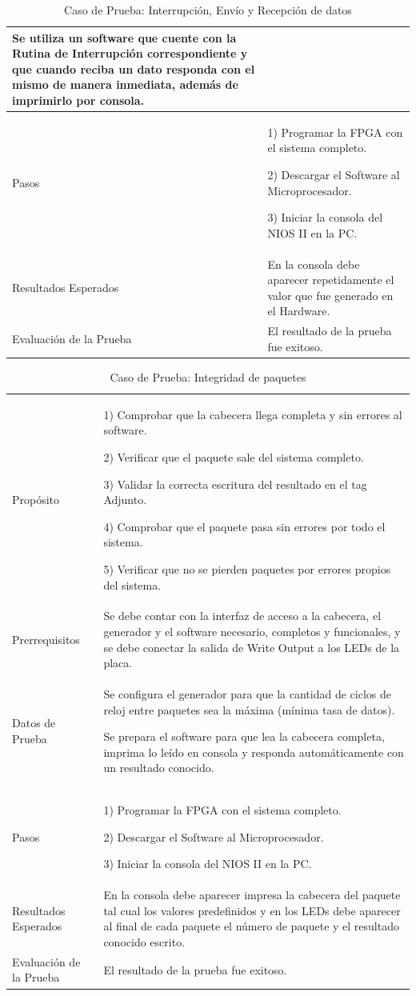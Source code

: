 \begin{table}
\begin{tabular}{|>{\columncolor[gray]{0.8}}l|p{11cm}|}
Se utiliza un software que cuente con la Rutina de Interrupción correspondiente y que cuando reciba un dato responda con el mismo de manera inmediata, además de imprimirlo por consola.
 \\ \hline
 Pasos & 1) Programar la FPGA con el sistema completo.

2) Descargar el Software al Microprocesador.

3) Iniciar la consola del NIOS II en la PC.
\\ \hline
 Resultados Esperados & En la consola debe aparecer repetidamente el valor que fue generado en el Hardware. \\ \hline
 Evaluación de la Prueba  & El resultado de la prueba fue exitoso.\\ \hline
	\end{tabular}
	\caption{Caso de Prueba: Interrupción, Envío y Recepción de datos}
	\label{tab:enviorecepcion}
\end{table}
\begin{table}
	\begin{tabular}{|>{\columncolor[gray]{0.8}}l|p{11cm}|} \hline
\multicolumn{2}{|>{\columncolor[gray]{0.8}}l|}{\textbf{Caso de Prueba: Integridad de paquetes }}\\ \hline
Propósito  & 1) Comprobar que la cabecera llega completa y sin errores al software. 

2) Verificar que el paquete sale del sistema completo.

3) Validar la correcta escritura del resultado en el tag Adjunto.

4) Comprobar que el paquete pasa sin errores por todo el sistema. 

5) Verificar que no se pierden paquetes por errores propios del sistema. 
\\ \hline
 Prerrequisitos  & Se debe contar con la interfaz de acceso a la cabecera, el generador y el software necesario, completos y funcionales, y se debe conectar la salida de Write Output a los LEDs de la placa.\\ \hline
 Datos de Prueba & Se configura el generador para que la cantidad de ciclos de reloj entre paquetes sea la máxima (mínima tasa de datos). 

Se prepara el software para que lea la cabecera completa, imprima lo leído en consola y responda automáticamente con un resultado conocido. 
 \\ \hline
 Pasos & 1) Programar la FPGA con el sistema completo.

2) Descargar el Software al Microprocesador.

3) Iniciar la consola del NIOS II en la PC.
\\ \hline
 Resultados Esperados & En la consola debe aparecer impresa la cabecera del paquete tal cual los valores predefinidos y en los LEDs debe aparecer al final de cada paquete el número de paquete y el resultado conocido escrito.  \\ \hline
 Evaluación de la Prueba  & El resultado de la prueba fue exitoso.\\ \hline
	\end{tabular}
	\caption{Caso de Prueba: Integridad de paquetes}
	\label{tab:integridad}
\end{table}
